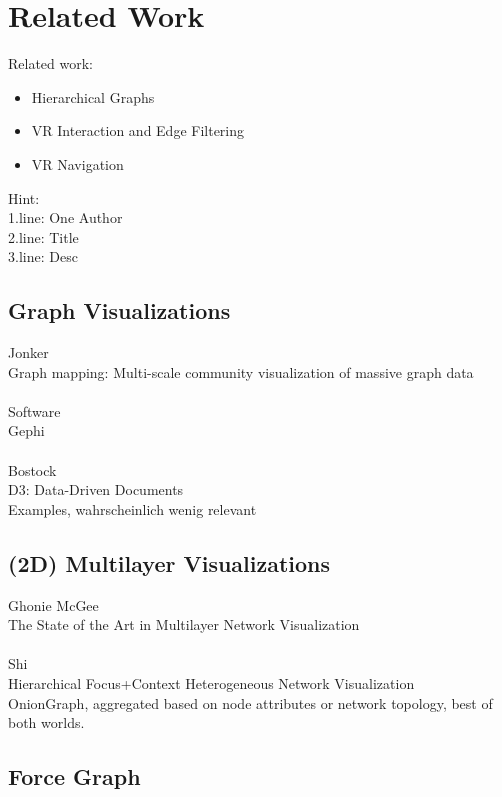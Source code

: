 \chapter{Related Work}

Related work:
\begin{itemize}
    \item Hierarchical Graphs
    \item VR Interaction and Edge Filtering
    \item VR Navigation
\end{itemize}

Hint:\\
1.line: One Author \\
2.line: Title \\
3.line: Desc\\

\section{Graph Visualizations}
Jonker\\
Graph mapping: Multi-scale community visualization of massive graph data\\
\\
Software\\
Gephi\\
\\
Bostock\\
D3: Data-Driven Documents\\
Examples, wahrscheinlich wenig relevant\\

\section{(2D) Multilayer Visualizations}

Ghonie McGee\\
The State of the Art in Multilayer Network Visualization\\
\\
Shi\\
Hierarchical Focus+Context Heterogeneous Network Visualization\\
OnionGraph, aggregated based on node attributes or network topology,
best of both worlds.\\

\section{Force Graph}

